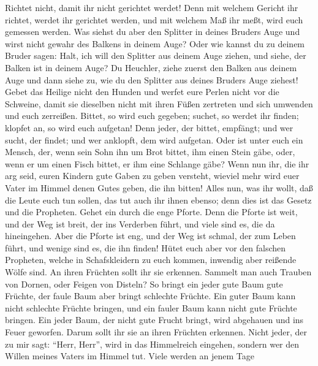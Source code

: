  Richtet nicht, damit ihr nicht gerichtet werdet!
 Denn mit welchem Gericht ihr richtet, werdet ihr
gerichtet werden, und mit welchem Maß ihr meßt, wird euch gemessen
werden.  Was siehst du aber den Splitter in deines Bruders
Auge und wirst nicht gewahr des Balkens in deinem Auge? 
Oder wie kannst du zu deinem Bruder sagen: Halt, ich will den Splitter
aus deinem Auge ziehen, und siehe, der Balken ist in deinem Auge?
 Du Heuchler, ziehe zuerst den Balken aus deinem Auge und
dann siehe zu, wie du den Splitter aus deines Bruders Auge ziehest!
 Gebet das Heilige nicht den Hunden und werfet eure Perlen
nicht vor die Schweine, damit sie dieselben nicht mit ihren Füßen
zertreten und sich umwenden und euch zerreißen.  Bittet,
so wird euch gegeben; suchet, so werdet ihr finden; klopfet an, so wird
euch aufgetan!  Denn jeder, der bittet, empfängt; und wer
sucht, der findet; und wer anklopft, dem wird aufgetan. 
Oder ist unter euch ein Mensch, der, wenn sein Sohn ihn um Brot bittet,
ihm einen Stein gäbe,  oder, wenn er um einen Fisch
bittet, er ihm eine Schlange gäbe?  Wenn nun ihr, die ihr
arg seid, euren Kindern gute Gaben zu geben versteht, wieviel mehr wird
euer Vater im Himmel denen Gutes geben, die ihn bitten! 
Alles nun, was ihr wollt, daß die Leute euch tun sollen, das tut auch
ihr ihnen ebenso; denn dies ist das Gesetz und die Propheten.
 Gehet ein durch die enge Pforte. Denn die Pforte ist
weit, und der Weg ist breit, der ins Verderben führt, und viele sind es,
die da hineingehen.  Aber die Pforte ist eng, und der Weg
ist schmal, der zum Leben führt, und wenige sind es, die ihn finden!
 Hütet euch aber vor den falschen Propheten, welche in
Schafskleidern zu euch kommen, inwendig aber reißende Wölfe sind.
 An ihren Früchten sollt ihr sie erkennen. Sammelt man
auch Trauben von Dornen, oder Feigen von Disteln?  So
bringt ein jeder gute Baum gute Früchte, der faule Baum aber bringt
schlechte Früchte.  Ein guter Baum kann nicht schlechte
Früchte bringen, und ein fauler Baum kann nicht gute Früchte bringen.
 Ein jeder Baum, der nicht gute Frucht bringt, wird
abgehauen und ins Feuer geworfen.  Darum sollt ihr sie an
ihren Früchten erkennen.  Nicht jeder, der zu mir sagt:
``Herr, Herr'', wird in das Himmelreich eingehen, sondern wer den Willen
meines Vaters im Himmel tut.  Viele werden an jenem Tage
